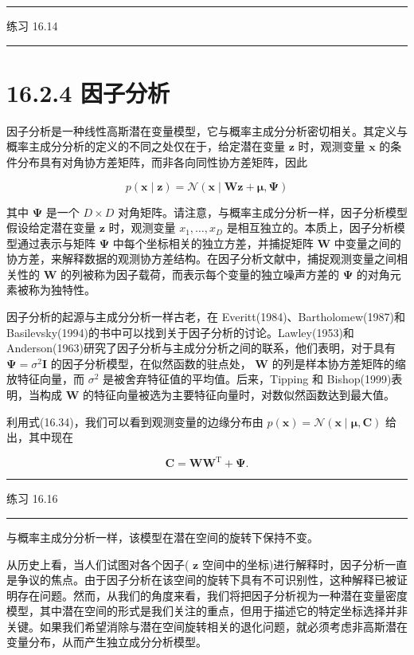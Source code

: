 \documentclass[10pt]{report}
\newcommand{\HRule}{\begin{center}\rule{0.9\linewidth}{0.2mm}\end{center}}
\begin{document}
\HRule

练习 16.14

\HRule

\section*{16.2.4 因子分析}

因子分析是一种线性高斯潜在变量模型，它与概率主成分分析密切相关。其定义与概率主成分分析的定义的不同之处仅在于，给定潜在变量 \(\mathbf{z}\) 时，观测变量 \(\mathbf{x}\) 的条件分布具有对角协方差矩阵，而非各向同性协方差矩阵，因此

\[
p\left( {\mathbf{x} \mid  \mathbf{z}}\right)  = \mathcal{N}\left( {\mathbf{x} \mid  \mathbf{W}\mathbf{z} + \mathbf{\mu },\mathbf{\Psi }}\right)  \tag{16.53}
\]

其中 \(\mathbf{\Psi }\) 是一个 \(D \times  D\) 对角矩阵。请注意，与概率主成分分析一样，因子分析模型假设给定潜在变量 \(\mathbf{z}\) 时，观测变量 \({x}_{1},\ldots ,{x}_{D}\) 是相互独立的。本质上，因子分析模型通过表示与矩阵 \(\mathbf{\Psi }\) 中每个坐标相关的独立方差，并捕捉矩阵 \(\mathbf{W}\) 中变量之间的协方差，来解释数据的观测协方差结构。在因子分析文献中，捕捉观测变量之间相关性的 \(\mathbf{W}\) 的列被称为因子载荷，而表示每个变量的独立噪声方差的 \(\mathbf{\Psi }\) 的对角元素被称为独特性。

因子分析的起源与主成分分析一样古老，在 Everitt(1984)、Bartholomew(1987)和 Basilevsky(1994)的书中可以找到关于因子分析的讨论。Lawley(1953)和 Anderson(1963)研究了因子分析与主成分分析之间的联系，他们表明，对于具有 \(\mathbf{\Psi } = {\sigma }^{2}\mathbf{I}\) 的因子分析模型，在似然函数的驻点处， \(\mathbf{W}\) 的列是样本协方差矩阵的缩放特征向量，而 \({\sigma }^{2}\) 是被舍弃特征值的平均值。后来，Tipping 和 Bishop(1999)表明，当构成 \(\mathbf{W}\) 的特征向量被选为主要特征向量时，对数似然函数达到最大值。

利用式(16.34)，我们可以看到观测变量的边缘分布由 \(p\left( \mathbf{x}\right)  = \mathcal{N}\left( {\mathbf{x} \mid  \mathbf{\mu },\mathbf{C}}\right)\) 给出，其中现在

\[
\mathbf{C} = \mathbf{W}{\mathbf{W}}^{\mathrm{T}} + \mathbf{\Psi }. \tag{16.54}
\]

\HRule

练习 16.16

\HRule

与概率主成分分析一样，该模型在潜在空间的旋转下保持不变。

从历史上看，当人们试图对各个因子( \(\mathbf{z}\) 空间中的坐标)进行解释时，因子分析一直是争议的焦点。由于因子分析在该空间的旋转下具有不可识别性，这种解释已被证明存在问题。然而，从我们的角度来看，我们将把因子分析视为一种潜在变量密度模型，其中潜在空间的形式是我们关注的重点，但用于描述它的特定坐标选择并非关键。如果我们希望消除与潜在空间旋转相关的退化问题，就必须考虑非高斯潜在变量分布，从而产生独立成分分析模型。
\end{document}
